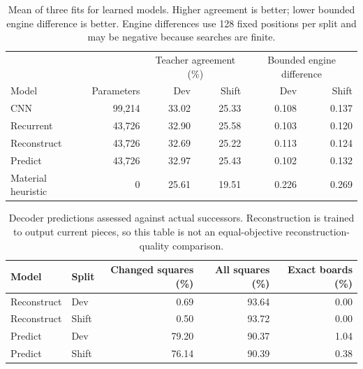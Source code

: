 \begin{table}[ht]
\centering\small
\begin{tabular}{lrrrrr}
\toprule
& & \multicolumn{2}{c}{Teacher agreement (\%)} & \multicolumn{2}{c}{Bounded engine difference} \\
Model & Parameters & Dev & Shift & Dev & Shift \\
\midrule
CNN & 99,214 & 33.02 & 25.33 & 0.108 & 0.137 \\
Recurrent & 43,726 & 32.90 & 25.58 & 0.103 & 0.120 \\
Reconstruct & 43,726 & 32.69 & 25.22 & 0.113 & 0.124 \\
Predict & 43,726 & 32.97 & 25.43 & 0.102 & 0.132 \\
\midrule
Material heuristic & 0 & 25.61 & 19.51 & 0.226 & 0.269 \\
\bottomrule
\end{tabular}
\caption{Mean of three fits for learned models. Higher agreement is better; lower bounded engine difference is better. Engine differences use 128 fixed positions per split and may be negative because searches are finite.}
\end{table}
\begin{table}[ht]
\centering\small
\begin{tabular}{llrrr}
\toprule
Model & Split & Changed squares (\%) & All squares (\%) & Exact boards (\%) \\
\midrule
Reconstruct & Dev & 0.69 & 93.64 & 0.00 \\
Reconstruct & Shift & 0.50 & 93.72 & 0.00 \\
Predict & Dev & 79.20 & 90.37 & 1.04 \\
Predict & Shift & 76.14 & 90.39 & 0.38 \\
\bottomrule
\end{tabular}
\caption{Decoder predictions assessed against actual successors. Reconstruction is trained to output current pieces, so this table is not an equal-objective reconstruction-quality comparison.}
\end{table}
